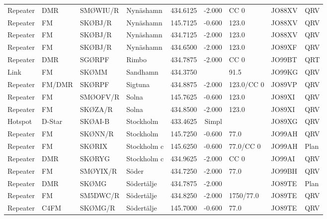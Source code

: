 \begin{longtable}{llllrrlll}
Repeater & DMR         & SMØWIU/R & Nynäshamn   & 434.6125     & -2.000     & CC 0       & JO88XV      & QRV      \\
Repeater & FM          & SKØBJ/R  & Nynäshamn   & 145.7125     & -0.600     & 123.0      & JO88XV      & QRV      \\
Repeater & FM          & SKØBJ/R  & Nynäshamn   & 434.7125     & -2.000     & 123.0      & JO88XV      & QRV      \\
Repeater & FM          & SKØBJ/R  & Nynäshamn   & 434.6500     & -2.000     & 123.0      & JO89XF      & QRV      \\
Repeater & DMR         & SGØRPF   & Rimbo       & 434.7875     & -2.000     & CC 0       & JO99BT      & QRT      \\
Link     & FM          & SKØMM    & Sandhamn    & 434.3750     &            & 91.5       & JO99KG      & QRV      \\
Repeater & FM/DMR      & SKØRPF   & Sigtuna     & 434.8875     & -2.000     & 123.0/CC 0 & JO89VP      & QRV      \\
Repeater & FM          & SMØOFV/R & Solna       & 145.7625     & -0.600     & 123.0      & JO89XI      & QRV      \\
Repeater & FM          & SKØZA/R  & Solna       & 434.8500     & -2.000     & 123.0      & JO89XI      & QRV      \\
Hotspot  & D-Star      & SKØAI-B  & Stockholm   & 433.4625     & Simpl      &            & JO89XG      & QRV      \\
Repeater & FM          & SKØNN/R  & Stockholm   & 145.7250     & -0.600     & 77.0       & JO99AH      & QRV      \\
Repeater & FM          & SKØRIX   & Stockholm c & 145.6250     & -0.600     & 77.0/CC 0  & JO99AH      & Plan     \\
Repeater & DMR         & SKØRYG   & Stockholm c & 434.9625     & -2.000     & CC 0       & JO99AI      & QRV      \\
Repeater & FM          & SMØYIX/R & Söder       & 434.7250     & -2.000     & 77.0       & JO99BH      & QRV      \\
Repeater & DMR         & SKØMG    & Södertälje  & 434.7875     & -2.000     &            & JO89TE      & Plan     \\
Repeater & FM          & SM5DWC/R & Södertälje  & 434.8250     & -2.000     & 1750/77.0  & JO89TE      & QRV      \\
Repeater & C4FM        & SKØMG/R  & Södertälje  & 145.7000     & -0.600     & 77.0       & JO89TE      & QRV      \\

\end{longtable}
